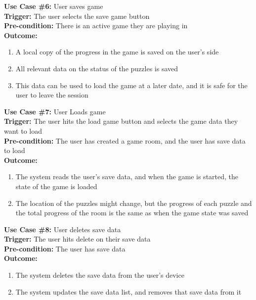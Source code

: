 \documentclass[12pt]{article}
\begin{document}
\textbf{Use Case \#6:} User saves game\\
\textbf{Trigger:} The user selects the save game button\\
\textbf{Pre-condition:} There is an active game they are playing in\\
\textbf{Outcome:}
\begin{enumerate}
	\item A local copy of the progress in the game is saved on the user's side
    \item All relevant data on the status of the puzzles is saved
    \item This data can be used to load the game at a later date, and it is safe for the user to leave the session
\end{enumerate}
\textbf{Use Case \#7:} User Loads game\\
\textbf{Trigger:} The user hits the load game button and selects the game data they want to load\\
\textbf{Pre-condition:} The user has created a game room, and the user has save data to load\\
\textbf{Outcome:}
\begin{enumerate}
	\item The system reads the user's save data, and when the game is started, the state of the game is loaded
    \item The location of the puzzles might change, but the progress of each puzzle and the total progress of the room is the same as when the game state was saved 
\end{enumerate}
\textbf{Use Case \#8:} User deletes save data\\
\textbf{Trigger:} The user hits delete on their save data\\
\textbf{Pre-condition:} The user has save data\\
\textbf{Outcome:}
\begin{enumerate}
	\item The system deletes the save data from the user's device
    \item The system updates the save data list, and removes that save data from it
\end{enumerate}
\end{document}
